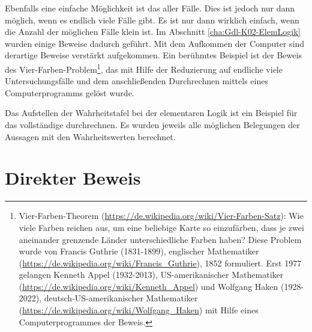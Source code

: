 \begin{Unit}
Ebenfalls eine einfache Möglichkeit ist das  
 aller Fälle. Dies ist jedoch nur dann 
möglich, wenn es endlich viele Fälle gibt. Es ist nur dann wirklich einfach, 
wenn die Anzahl der möglichen Fälle klein ist. Im Abschnitt 
\ref{cha:Gdl-K02-ElemLogik} wurden einige Beweise dadurch geführt. Mit dem 
Aufkommen der Computer sind derartige Beweise verstärkt aufgekommen. Ein 
berühmtes Beispiel ist der Beweis des Vier-Farben-Problem\footnote{
  Vier-Farben-Theorem (\url{https://de.wikipedia.org/wiki/Vier-Farben-Satz}): 
  Wie viele Farben reichen aus, um eine beliebige Karte so einzufärben, dass 
  je zwei aneinander grenzende Länder unterschiedliche Farben haben? Diese 
  Problem wurde von Francis Guthrie (1831-1899),
  englischer Mathematiker 
  (\url{https://de.wikipedia.org/wiki/Francis_Guthrie}), 1852 formuliert. Erst 
  1977 gelangen Kenneth Appel (1932-2013),
  US-amerikanischer Mathematiker
  (\url{https://de.wikipedia.org/wiki/Kenneth_Appel}) und Wolfgang Haken
   (1928-2022), deutsch-US-amerikanischer 
  Mathematiker (\url{https://de.wikipedia.org/wiki/Wolfgang_Haken}) mit Hilfe 
  eines Computerprogrammes der Beweis.}, 
das mit Hilfe der Reduzierung auf endliche viele Untersuchungsfälle und dem
anschließenden Durchrechnen mittels eines Computerprogramms gelöst wurde.
\end{Unit}

\begin{Unit}[Beispiel]

Das Aufstellen der Wahrheitstafel bei der elementaren Logik ist ein Beispiel
für das vollständige durchrechnen. Es wurden jeweils alle möglichen Belegungen 
der Aussagen mit den Wahrheitswerten berechnet.
\end{Unit}

\section{Direkter Beweis}
\label{sec:Beweis - direkt}

